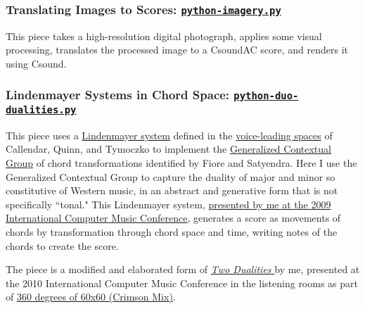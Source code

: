 \documentclass[letterpaper,10pt,DIV=12,parskip=half]{scrartcl}
\begin{document}
\subsubsection{Translating Images to Scores:  \href{https://github.com/gogins/csound-ac/blob/master/user-guide/python-imagery.py}{\lstinline|python-imagery.py|}}

This piece takes a high-resolution digital photograph, applies some visual processing, translates the processed image to a CsoundAC score, and renders it using Csound.

\subsubsection{Lindenmayer Systems in Chord Space: \href{https://github.com/gogins/csound-ac/blob/master/user-guide/python-duo-dualities.py}{\lstinline|python-duo-dualities.py|}}

This piece uses a \href{https://algorithmicbotany.org/papers/abop/abop.pdf}{Lindenmayer system} defined in the \href{https://dmitri.mycpanel.princeton.edu/files/publications/science2.pdf}{voice-leading spaces} of Callendar, Quinn, and Tymoczko to implement the \href{https://www.mtosmt.org/issues/mto.05.11.3/mto.05.11.3.fiore_satyendra.pdf}{Generalized Contextual Group} of chord transformations identified by Fiore and Satyendra. Here I use the Generalized Contextual Group to capture the duality of major and minor so constitutive of Western music, in an abstract and generative form that is not specifically ``tonal." This Lindenmayer system, \href{https://citeseerx.ist.psu.edu/document?repid=rep1&type=pdf&doi=dd8623bbe8c889b2c56d6a1fc0fc55c61b362ee4}{presented by me at the 2009 International Computer Music Conference}, generates a score as movements of chords by transformation through chord space and time, writing notes of the chords to create the score. 

The piece is a modified and elaborated form of \href{https://music.youtube.com/watch?v=3_ahbL44p-E}{\emph{Two Dualities} }by me, presented at the 2010 International Computer Music Conference in the listening rooms as part of \href{http://www.voxnovus.com/60x60/2010_Crimson_Mix.htm}{360 degrees of 60x60 (Crimson Mix)}.
\end{document}

